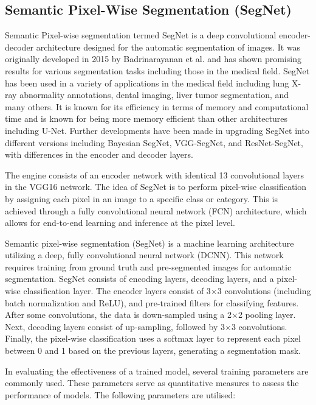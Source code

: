 \subsection{Semantic Pixel-Wise Segmentation (SegNet)}
Semantic Pixel-wise segmentation termed SegNet is a deep convolutional encoder-decoder architecture designed for the automatic segmentation of images. It was originally developed in 2015 by Badrinarayanan et al.\cite{} and has shown promising results for various segmentation tasks including those in the medical field. SegNet has been used in a variety of applications in the medical field including lung X-ray abnormality annotations\cite{}, dental imaging\cite{kwak2020}, liver tumor segmentation\cite{Priyadarsini2022}, and many others. It is known for its efficiency in terms of memory and computational time and is known for being more memory efficient than other architectures including U-Net\cite{Mirzazade2021}. Further developments have been made in upgrading SegNet into different versions including Bayesian SegNet\cite{Dhanagopal2022}, VGG-SegNet\cite{}, and ResNet-SegNet\cite{}, with differences in the encoder and decoder layers.

The engine consists of an encoder network with identical 13 convolutional layers in the VGG16 network. The idea of SegNet is to perform pixel-wise classification by assigning each pixel in an image to a specific class or category. This is achieved through a fully convolutional neural network (FCN) architecture, which allows for end-to-end learning and inference at the pixel level. 

Semantic pixel-wise segmentation (SegNet) is a machine learning architecture utilizing a deep, fully convolutional neural network (DCNN). This network requires training from ground truth and pre-segmented images for automatic segmentation. SegNet consists of encoding layers, decoding layers, and a pixel-wise classification layer. The encoder layers consist of 3$\times$3 convolutions (including batch normalization and ReLU), and pre-trained filters for classifying features. After some convolutions, the data is down-sampled using a 2$\times$2 pooling layer. Next, decoding layers consist of up-sampling, followed by 3$\times$3 convolutions. Finally, the pixel-wise classification uses a softmax layer to represent each pixel between 0 and 1 based on the previous layers, generating a segmentation mask.

In evaluating the effectiveness of a trained model, several training parameters are commonly used. These parameters serve as quantitative measures to assess the performance of models. The following parameters are utilised:

